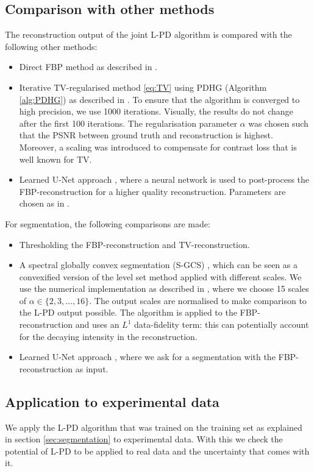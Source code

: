 \documentclass[journal]{IEEEtran}
\newcommand{\hl}[1]{\cbcolor{red}\begin{changebar}{\color{red} #1}\end{changebar}}
\begin{document}
\subsection{Comparison with other methods}\label{sec:comparison}
\hl{The reconstruction output of the joint L-PD algorithm is compared with the following other methods:
\begin{itemize}
\item Direct FBP method as described in \cite{Willemink2010}.
\item Iterative TV-regularised method \eqref{eq:TV} using PDHG (Algorithm \ref{alg:PDHG}) as described in \cite{Boink2018}. To ensure that the algorithm is converged to high precision, we use 1000 iterations. Visually, the results do not change after the first 100 iterations. The regularisation parameter $\alpha$ was chosen such that the PSNR between ground truth and reconstruction is highest. Moreover, a scaling was introduced to compensate for contrast loss that is well known for TV.
\item Learned U-Net approach \cite{Jin2017}, where a neural network is used to post-process the FBP-reconstruction for a higher quality reconstruction. Parameters are chosen as in \cite{Jin2017}. 
\end{itemize}
For segmentation, the following comparisons are made:
\begin{itemize}
\item Thresholding the FBP-reconstruction and TV-reconstruction.
\item A spectral globally convex segmentation (S-GCS) \cite{Zeune2017}, which can be seen as a convexified version of the level set method \cite{Goldstein2010} applied with different scales. We use the numerical implementation as described in \cite{Zeune2017}, where we choose 15 scales of $\alpha\in\{2,3,\dots,16\}$.   The output scales are normalised to make comparison to the L-PD output possible. The algorithm is applied to the FBP-reconstruction and uses an $L^1$ data-fidelity term: this can potentially account for the decaying intensity in the reconstruction. 
\item Learned U-Net approach \cite{Ronneberger2015}, where we ask for a segmentation with the FBP-reconstruction as input.
\end{itemize}
}

\subsection{Application to experimental data}\label{sec:exp_phantom}
\hl{We apply the L-PD algorithm that was trained on the training set as explained in section \ref{sec:segmentation} to experimental data. With this we check the potential of L-PD to be applied to real data and the uncertainty that comes with it.}
\end{document}

